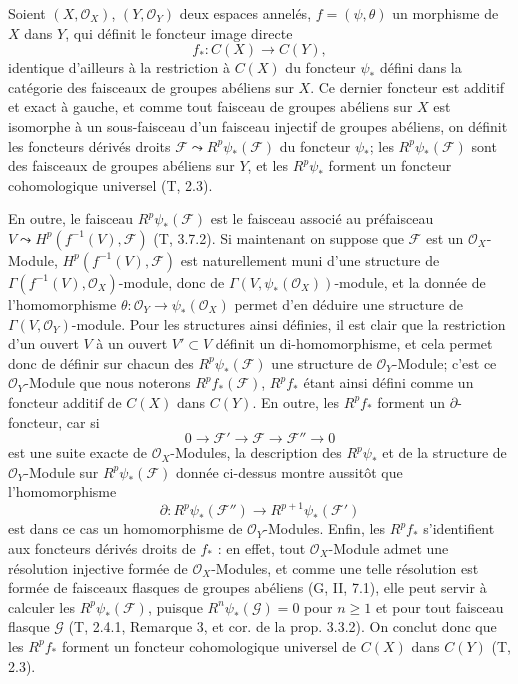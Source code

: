 \begin{env}[12.2.1]
\label{0.12.2.1-fr}
Soient $(X,\mathcal O_X)$, $(Y,\mathcal O_Y)$ deux espaces annelés,
$f=(\psi,\theta)$ un morphisme de $X$ dans $Y$, qui définit le foncteur
image directe
\[
f_*:C(X)\longrightarrow C(Y),
\]
identique d'ailleurs à la restriction à $C(X)$ du foncteur $\psi_*$ défini
dans la catégorie des faisceaux de groupes abéliens sur $X$. Ce dernier
foncteur est additif et exact à gauche, et comme tout faisceau de groupes
abéliens sur $X$ est isomorphe à un sous-faisceau d'un faisceau injectif de
groupes abéliens, on définit les foncteurs dérivés droits
$\mathcal F\leadsto R^p\psi_*(\mathcal F)$ du foncteur $\psi_*$; les
$R^p\psi_*(\mathcal F)$ sont des faisceaux de groupes abéliens sur $Y$, et
les $R^p\psi_*$ forment un foncteur cohomologique universel (T, 2.3).

En outre, le faisceau $R^p\psi_*(\mathcal F)$ est le faisceau associé au
préfaisceau $V\leadsto H^p(f^{-1}(V),\mathcal F)$ (T, 3.7.2). Si maintenant
on suppose que $\mathcal F$ est un $\mathcal O_X$-Module,
$H^p(f^{-1}(V),\mathcal F)$ est naturellement muni d'une structure de
$\Gamma(f^{-1}(V),\mathcal O_X)$-module, donc de
$\Gamma(V,\psi_*(\mathcal O_X))$-module, et la donnée de l'homomorphisme
$\theta:\mathcal O_Y\to\psi_*(\mathcal O_X)$ permet d'en déduire une
structure de $\Gamma(V,\mathcal O_Y)$-module. Pour les structures ainsi
définies, il est clair que la restriction d'un ouvert $V$ à un ouvert
$V'\subset V$ définit un di-homomorphisme, et cela permet donc de définir sur
chacun des $R^p\psi_*(\mathcal F)$ une structure de $\mathcal O_Y$-Module;
c'est ce $\mathcal O_Y$-Module que nous noterons $R^p f_*(\mathcal F)$,
$R^p f_*$ étant ainsi défini comme un foncteur additif de $C(X)$ dans
$C(Y)$. En outre, les $R^p f_*$ forment un $\partial$-foncteur, car si
\[
0\longrightarrow\mathcal F'\longrightarrow\mathcal F
\longrightarrow\mathcal F''\longrightarrow0
\]
est une suite exacte de $\mathcal O_X$-Modules, la description des
$R^p\psi_*$ et de la structure de $\mathcal O_Y$-Module sur
$R^p\psi_*(\mathcal F)$ donnée ci-dessus montre aussitôt que
l'homomorphisme
\[
\partial:R^p\psi_*(\mathcal F'')\longrightarrow
R^{p+1}\psi_*(\mathcal F')
\]
est dans ce cas un homomorphisme de $\mathcal O_Y$-Modules. Enfin, les
$R^p f_*$ s'identifient aux foncteurs dérivés droits de $f_*$ : en effet,
tout $\mathcal O_X$-Module admet une résolution injective formée de
$\mathcal O_X$-Modules, et comme une telle résolution est formée de faisceaux
flasques de groupes abéliens (G, II, 7.1), elle peut servir à calculer les
$R^p\psi_*(\mathcal F)$, puisque $R^n\psi_*(\mathcal G)=0$ pour $n\geq1$ et
pour tout faisceau flasque $\mathcal G$ (T, 2.4.1, Remarque 3, et cor. de la
prop. 3.3.2). On conclut donc que les $R^p f_*$ forment un foncteur
cohomologique universel de $C(X)$ dans $C(Y)$ (T, 2.3).
\end{env}

